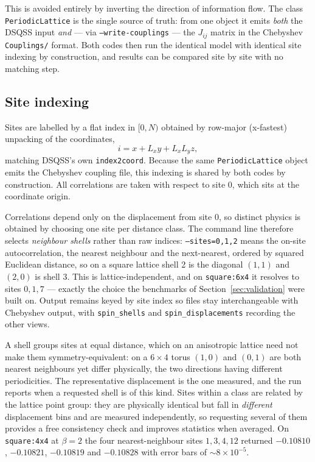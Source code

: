 \documentclass[11pt,a4paper]{article}
\newcommand{\code}[1]{\texttt{#1}}
\begin{document}
This is avoided entirely by inverting the direction of information flow. The
class \code{PeriodicLattice} is the single source of truth: from one object it
emits \emph{both} the DSQSS input \emph{and} --- via
\code{--write-couplings} --- the $J_{ij}$ matrix in the Chebyshev
\code{Couplings/} format. Both codes then run the identical model with identical
site indexing by construction, and results can be compared site by site with no
matching step.

\subsection{Site indexing}
\label{sec:siteindex}

Sites are labelled by a flat index in $[0,N)$ obtained by row-major (x-fastest)
unpacking of the coordinates,
\begin{equation}
  i = x + L_x y + L_x L_y z ,
\end{equation}
matching DSQSS's own \code{index2coord}. Because the same
\code{PeriodicLattice} object emits the Chebyshev coupling file, this indexing
is shared by both codes by construction. All correlations are taken with respect
to site $0$, which sits at the coordinate origin.

Correlations depend only on the displacement from site $0$, so distinct physics
is obtained by choosing one site per distance class. The command line therefore
selects \emph{neighbour shells} rather than raw indices: \code{--sites=0,1,2}
means the on-site autocorrelation, the nearest neighbour and the next-nearest,
ordered by squared Euclidean distance, so on a square lattice shell 2 is the
diagonal $(1,1)$ and $(2,0)$ is shell 3. This is lattice-independent, and on
\code{square:6x4} it resolves to sites $0,1,7$ --- exactly the choice the
benchmarks of Section~\ref{sec:validation} were built on. Output remains keyed
by site index so files stay interchangeable with Chebyshev output, with
\code{spin\_shells} and \code{spin\_displacements} recording the other views.

A shell groups sites at equal distance, which on an anisotropic lattice need not
make them symmetry-equivalent: on a $6\times4$ torus $(1,0)$ and $(0,1)$ are
both nearest neighbours yet differ physically, the two directions having
different periodicities. The representative displacement is the one measured,
and the run reports when a requested shell is of this kind. Sites within a class are
related by the lattice point group: they are physically identical but fall in
\emph{different} displacement bins and are measured independently, so requesting
several of them provides a free consistency check and improves statistics when
averaged. On \code{square:4x4} at $\beta=2$ the four nearest-neighbour sites
$1,3,4,12$ returned $-0.10810$, $-0.10821$, $-0.10819$ and $-0.10828$ with error
bars of $\sim 8\times10^{-5}$.
\end{document}
